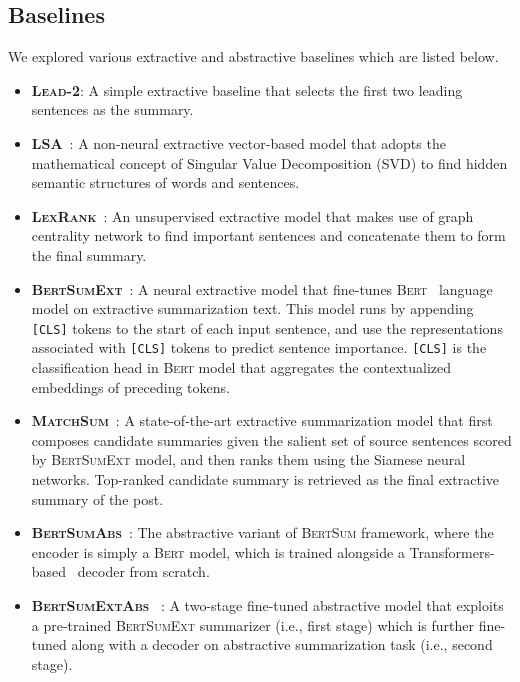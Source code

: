 \documentclass[10pt, a4paper]{article}
\begin{document}
\subsection{Baselines}
We explored various extractive and abstractive baselines which are listed below. 
\begin{itemize}[leftmargin=*,label={-}]
\item \textsc{\textbf{Lead-2}}: A simple extractive baseline that selects the first two leading sentences as the summary. 

\item \textsc{\textbf{LSA}}~\cite{Steinberger2004LSA}: A non-neural extractive vector-based model that adopts the mathematical concept of Singular Value Decomposition (SVD) to find hidden semantic structures of words and sentences.


\item \textsc{\textbf{LexRank}}~\cite{Erkan2004LexRankGL}: An unsupervised extractive model that makes use of graph centrality network to find important sentences and concatenate them to form the final summary. 


\item \textsc{\textbf{BertSumExt}}~\cite{Liu2019TextSW}: A neural extractive model that fine-tunes \textsc{Bert}~\cite{Devlin2019BERTPO} language model on extractive summarization text. This model runs by appending \texttt{[CLS]} tokens to the start of each input sentence, and use the representations associated with \texttt{[CLS]} tokens to predict sentence importance. \texttt{[CLS]} is the classification head in \textsc{Bert} model that aggregates the contextualized embeddings of preceding tokens.


\item \textsc{\textbf{MatchSum}}~\cite{Zhong2020ExtractiveSA}: A state-of-the-art extractive summarization model that first composes candidate summaries given the salient set of source sentences scored by \textsc{BertSumExt} model, and then ranks them using the Siamese neural networks. Top-ranked candidate summary is retrieved as the final extractive summary of the post.

\item \textsc{\textbf{BertSumAbs}}~\cite{Liu2019TextSW}: The abstractive variant of \textsc{BertSum} framework, where the encoder is simply a \textsc{Bert} model, which is trained alongside a Transformers-based~\cite{Vaswani2017Att} decoder from scratch. 



\item \textsc{\textbf{BertSumExtAbs}} ~\cite{Liu2019TextSW}: A two-stage fine-tuned abstractive model that exploits a pre-trained \textsc{BertSumExt} summarizer (i.e., first stage) which is further fine-tuned along with a decoder on abstractive summarization task (i.e., second stage).


\end{itemize}
\end{document}
